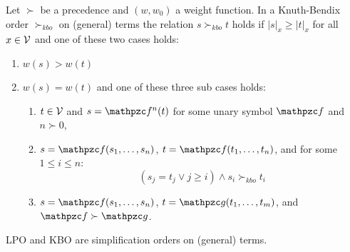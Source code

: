 \begin{definition}[KBO]\label{def:kbo}
	Let $\succ$ be a precedence and $(w,w_0)$ a weight function.
	In a Knuth-Bendix order $\succ_{kbo}$ on (general) terms the relation $s\succ_{kbo} t$ holds if
	$|s|_x\geq|t|_x$ for all $x\in\mathcal{V}$ and one of these two cases holds:
	\begin{enumerate}
		\item $w(s) > w(t)$
		\item $w(s) = w(t)$ and one of these three sub cases holds:
		\begin{enumerate}
			\item $t\in\mathcal{V}$ and $s=\mcf^n(t)$ for some unary symbol $\mcf$ and $n\succ0$,
			\item $s=\mcf(s_1,\ldots,s_n)$, $t=\mcf(t_1,\ldots,t_n)$, and for some $1\leq i\leq n$:
			\[
			(s_j=t_j \lor j\geq i) \land s_i\succ_{kbo} t_i
			\]
			\item $s=\mcf(s_1,\ldots,s_n)$, $t=\mcg(t_1,\ldots,t_m)$, and $\mcf\succ\mcg$.
		\end{enumerate}
	\end{enumerate}
\end{definition}

\begin{lemma}
	LPO and KBO are simplification orders on (general) terms.
\end{lemma}

